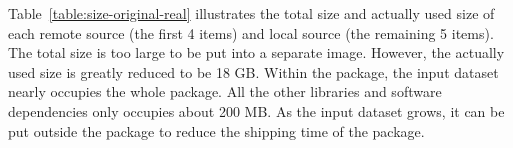 Table~\ref{table:size-original-real} illustrates the total size and actually used size of each remote source (the first 4 items) and local source (the remaining 5 items).
The total size is too large to be put into a separate image. However, the actually used size is greatly reduced to be 18 GB.
Within the package, the input dataset nearly occupies the whole package. All the other libraries and software dependencies only occupies about 200 MB.
As the input dataset grows, it can be put outside the package to reduce the shipping time of the package.

